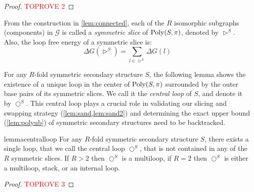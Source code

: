 \begin{proof}\textcolor{red}{TOPROVE 2}\end{proof}

\begin{Definition}\label{def:symmetric slice}
	From the construction in \cref{lem:connected}, each of the $R$ 
	isomorphic subgraphs (components) in $ \mathcal{G}$ is called a {\em symmetric slice} of $\mathrm{Poly}(S,\pi)$,  denoted  by $\rhd^{S}$. Also, the loop free energy of a symmetric slice is: 
	\begin{equation}
		\Delta G(\rhd^{S}) = \sum_{l\in \rhd^{S}} \Delta G(l)
	\end{equation}
\end{Definition}

For any $R$-fold symmetric secondary structure $S$, the following lemma shows the existence of a unique loop in the center of $\mathrm{Poly}(S,\pi)$  surrounded by the outer base pairs of its symmetric slices. We call it the {\em central loop} of $S$, and denote it by $\bigcirc^S$. This central loop plays a crucial role in validating our slicing and swapping strategy  (\cref{lem:sand,lem:sand2}) and determining the exact upper bound (\cref{lem:polyub}) of symmetric secondary structures need to be backtracked.  


\begin{restatable}{lemma}{centralloop} 
	\label{lem:centralloop}
	For any $R$-fold symmetric secondary structure $S$, there exists a single loop, that we call the central loop $\bigcirc^S$, that is not contained in any of the $R$ symmetric slices. 
	If $R>2$ then $\bigcirc^S$ is a multiloop, if $R=2$ then $\bigcirc^S$ is either a multiloop, stack, or an internal loop.   
\end{restatable}
\begin{proof}\textcolor{red}{TOPROVE 3}\end{proof}


